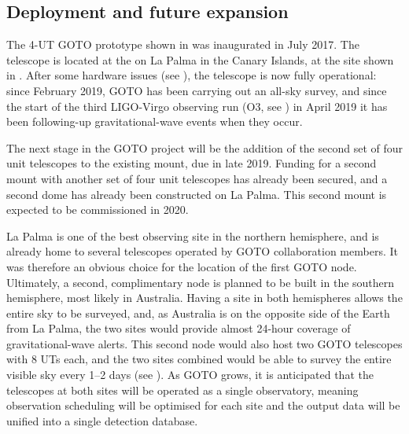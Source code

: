 
\subsection{Deployment and future expansion}
\label{sec:goto_expansion}
\begin{colsection}

The 4-UT GOTO prototype shown in  was inaugurated in July 2017. The telescope is located at the  on La Palma in the Canary Islands, at the site shown in . After some hardware issues (see ), the telescope is now fully operational: since February 2019, GOTO has been carrying out an all-sky survey, and since the start of the third LIGO-Virgo observing run (O3, see ) in April 2019 it has been following-up gravitational-wave events when they occur.

The next stage in the GOTO project will be the addition of the second set of four unit telescopes to the existing mount, due in late 2019. Funding for a second mount with another set of four unit telescopes has already been secured, and a second dome has already been constructed on La Palma. This second mount is expected to be commissioned in 2020.

La Palma is one of the best observing site in the northern hemisphere, and is already home to several telescopes operated by GOTO collaboration members. It was therefore an obvious choice for the location of the first GOTO node. Ultimately, a second, complimentary node is planned to be built in the southern hemisphere, most likely in Australia. Having a site in both hemispheres allows the entire sky to be surveyed, and, as Australia is on the opposite side of the Earth from La Palma, the two sites would provide almost 24-hour coverage of gravitational-wave alerts. This second node would also host two GOTO telescopes with 8 UTs each, and the two sites combined would be able to survey the entire visible sky every 1--2 days (see ). As GOTO grows, it is anticipated that the telescopes at both sites will be operated as a single observatory, meaning observation scheduling will be optimised for each site and the output data will be unified into a single detection database.


\end{colsection}
